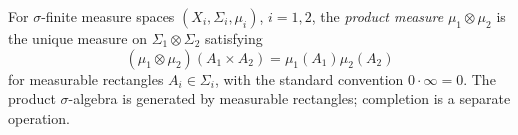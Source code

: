 
For $\sigma$-finite measure spaces $(X_i,\Sigma_i,\mu_i)$, $i=1,2$, the \emph{product measure} $\mu_1\otimes\mu_2$ is the unique measure on $\Sigma_1\otimes\Sigma_2$ satisfying
\[
(\mu_1\otimes\mu_2)(A_1\times A_2)=\mu_1(A_1)\mu_2(A_2)
\]
for measurable rectangles $A_i\in\Sigma_i$, with the standard convention $0\cdot\infty=0$. The product $\sigma$-algebra is generated by measurable rectangles; completion is a separate operation.
